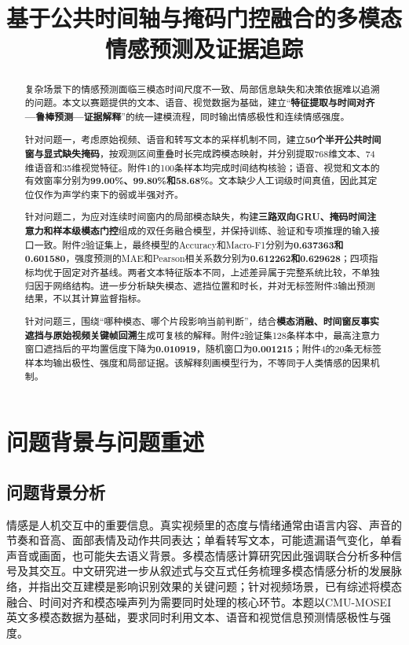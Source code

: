 \documentclass{gmcmthesis}
\title{基于公共时间轴与掩码门控融合的多模态情感预测及证据追踪}
\begin{document}
\maketitle
\begin{abstract}
复杂场景下的情感预测面临三模态时间尺度不一致、局部信息缺失和决策依据难以追溯的问题。本文以赛题提供的文本、语音、视觉数据为基础，建立“\textbf{特征提取与时间对齐—鲁棒预测—证据解释}”的统一建模流程，同时输出情感极性和连续情感强度。

针对问题一，考虑原始视频、语音和转写文本的采样机制不同，建立\textbf{50个半开公共时间窗与显式缺失掩码}，按观测区间重叠时长完成跨模态映射，并分别提取768维文本、74维语音和35维视觉特征。附件1的100条样本均完成时间结构核验；语音、视觉和文本的有效窗率分别为\textbf{99.00\%、99.80\%和58.68\%}。文本缺少人工词级时间真值，因此其定位仅作为声学约束下的弱或半强对齐。

针对问题二，为应对连续时间窗内的局部模态缺失，构建\textbf{三路双向GRU、掩码时间注意力和样本级模态门控}组成的双任务融合模型，并保持训练、验证和专项推理的输入接口一致。附件2验证集上，最终模型的Accuracy和Macro-F1分别为\textbf{0.637363和0.601580}，强度预测的MAE和Pearson相关系数分别为\textbf{0.612262和0.629628}；四项指标均优于固定对齐基线。两者文本特征版本不同，上述差异属于完整系统比较，不单独归因于网络结构。进一步分析缺失模态、遮挡位置和时长，并对无标签附件3输出预测结果，不以其计算监督指标。

针对问题三，围绕“哪种模态、哪个片段影响当前判断”，结合\textbf{模态消融、时间窗反事实遮挡与原始视频关键帧回溯}生成可复核的解释。附件2验证集128条样本中，最高注意力窗口遮挡后的平均置信度下降为\textbf{0.010919}，随机窗口为\textbf{0.001215}；附件4的20条无标签样本均输出极性、强度和局部证据。该解释刻画模型行为，不等同于人类情感的因果机制。
\end{abstract}
\pagestyle{plain}
\maketoc
\clearpage
\section{问题背景与问题重述}
\subsection{问题背景分析}
情感是人机交互中的重要信息。真实视频里的态度与情绪通常由语言内容、声音的节奏和音高、面部表情及动作共同表达；单看转写文本，可能遗漏语气变化，单看声音或画面，也可能失去语义背景。多模态情感计算研究因此强调联合分析多种信号及其交互\cite{poria2017review,baltrusaitis2019multimodal}。中文研究进一步从叙述式与交互式任务梳理多模态情感分析的发展脉络，并指出交互建模是影响识别效果的关键问题\cite{zhang2020multimodal}；针对视频场景，已有综述将模态融合、时间对齐和模态噪声列为需要同时处理的核心环节\cite{duan2025videomultimodal}。本题以CMU-MOSEI英文多模态数据为基础，要求同时利用文本、语音和视觉信息预测情感极性与强度。
\end{document}

